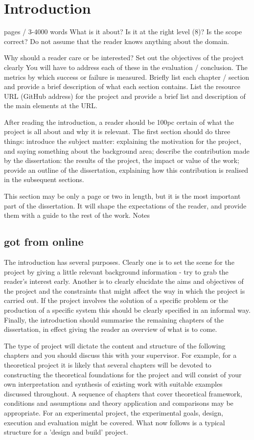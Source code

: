 \chapter{Introduction}
 pages / 3-4000 words
What is it about? Is it at the right level (8)? Is the scope correct? Do not assume that the reader knows anything about the domain.

Why should a reader care or be interested?
Set out the objectives of the project clearly
You will have to address each of these in the evaluation / conclusion.
The metrics by which success or failure is measured.
Briefly list each chapter / section and provide a brief description of what each section contains.
List the resource URL (GitHub address) for the project and provide a brief list and description of the main elements at the URL.

After reading the introduction, a reader should be 100pc certain of what the project is all about and why it is relevant.
The first section should do three things: introduce the subject matter: explaining the motivation for the project, and saying something about the background area; describe the contribution made by the dissertation: the results of the project, the impact or value of the work; provide an outline of the dissertation, explaining how this contribution is realised in the subsequent sections.

This section may be only a page or two in length, but it is the most important part of the dissertation. It will shape the expectations of the reader, and provide them with a guide to the rest of the work.
Notes
\section{got from online}
The introduction has several purposes. Clearly one is to set the scene for the project by giving a little relevant background information - try to grab the reader's interest early. Another is to clearly elucidate the aims and objectives of the project and the constraints that might affect the way in which the project is carried out. If the project involves the solution of a specific problem or the production of a specific system this should be clearly specified in an informal way. Finally, the introduction should summarise the remaining chapters of the dissertation, in effect giving the reader an overview of what is to come.

The type of project will dictate the content and structure of the following chapters and you should discuss this with your supervisor. For example, for a theoretical project it is likely that several chapters will be devoted to constructing the theoretical foundations for the project and will consist of your own interpretation and synthesis of existing work with suitable examples discussed throughout. A sequence of chapters that cover theoretical framework, conditions and assumptions and theory application and comparisons may be appropriate. For an experimental project, the experimental goals, design, execution and evaluation might be covered. What now follows is a typical structure for a 'design and build' project. 

